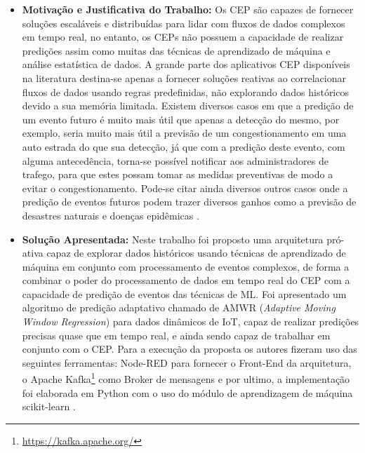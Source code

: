 \documentclass[tid,table]{texufpel} %
\begin{document}
\begin{itemize}
	\item \textbf{Motivação e Justificativa do Trabalho:} Os CEP são capazes de fornecer soluções escaláveis e distribuídas para lidar com fluxos de dados complexos em tempo real, no entanto, os CEPs  não possuem a capacidade de realizar predições assim como muitas das técnicas de aprendizado de máquina e análise estatística de dados. A grande parte dos aplicativos CEP disponíveis  na literatura destina-se apenas a fornecer soluções reativas ao correlacionar fluxos de dados usando regras predefinidas, não explorando dados históricos devido a sua memória limitada. Existem diversos casos em que a predição de um evento futuro é muito mais útil que apenas a detecção do mesmo, por exemplo, seria muito mais útil a previsão de um congestionamento em uma auto estrada do que sua detecção, já que com a predição deste evento, com alguma antecedência, torna-se possível notificar aos administradores de trafego, para que estes possam tomar as medidas preventivas de modo a evitar o congestionamento. Pode-se citar ainda diversos outros casos onde a predição de eventos futuros podem trazer diversos ganhos como a previsão de desastres naturais e doenças epidêmicas \cite{art4akbar2017predictive}. 
	
     \item \textbf{Solução Apresentada:} Neste trabalho foi proposto uma arquitetura pró-ativa capaz de explorar dados históricos usando técnicas de aprendizado de máquina em conjunto com processamento de eventos complexos, de forma a combinar o poder do processamento de dados em tempo real do CEP com a capacidade de predição de eventos das técnicas de ML. Foi apresentado um algoritmo de predição adaptativo chamado de AMWR (\textit{Adaptive Moving Window Regression}) para dados dinâmicos de IoT, capaz de realizar predições precisas quase que em tempo real, e ainda sendo capaz de trabalhar em conjunto com o CEP. Para a execução da proposta os autores fizeram uso das seguintes ferramentas: Node-RED para fornecer o Front-End da arquitetura, o Apache Kafka\footnote{\url{https://kafka.apache.org/}} como Broker de mensagens e por ultimo, a implementação foi elaborada em Python com o uso do módulo de aprendizagem de máquina scikit-learn \cite{art4akbar2017predictive}.  
     
     
     

\end{itemize}
\end{document}
